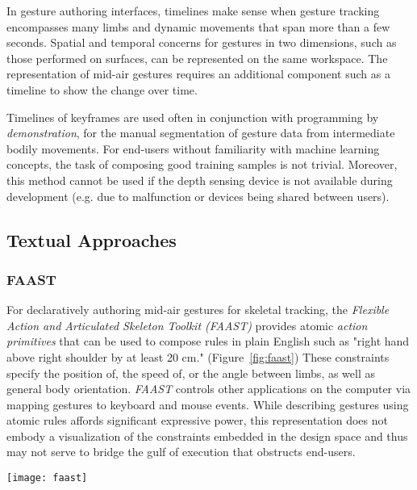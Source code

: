 In gesture authoring interfaces, timelines make sense when gesture tracking encompasses many limbs and dynamic movements that span more than a few seconds. Spatial and temporal concerns for gestures in two dimensions, such as those performed on surfaces, can be represented on the same workspace. The representation of mid-air gestures requires an additional component such as a timeline to show the change over time.

Timelines of keyframes are used often in conjunction with programming by \emph{demonstration}, for the manual segmentation of gesture data from intermediate bodily movements. For end-users without familiarity with machine learning concepts, the task of composing good training samples is not trivial. Moreover, this method cannot be used if the depth sensing device is not available during development (e.g. due to malfunction or devices being shared between users).

\subsection{Textual Approaches}

\subsubsection{FAAST}

For declaratively authoring mid-air gestures for skeletal tracking, the \emph{Flexible Action and Articulated Skeleton Toolkit (FAAST)} \parencite{Suma:2013} provides atomic \emph{action primitives} that can be used to compose rules in plain English such as "right hand above right shoulder by at least 20 cm." (Figure~\ref{fig:faast}) These constraints specify the position of, the speed of, or the angle between limbs, as well as general body orientation. \emph{FAAST} controls other applications on the computer via mapping gestures to keyboard and mouse events. While describing gestures using atomic rules affords significant expressive power, this representation does not embody a visualization of the constraints embedded in the design space and thus may not serve to bridge the gulf of execution that obstructs end-users.

\begin{SCfigure}[\sidecaptionrelwidth][ht]
\centering
\texttt{[image: faast]}
\caption{FAAST \parencite{Suma:2013} provides atomic primitives that can be used to compose rules in plain English that map to mid-air gestures.}
\label{fig:faast}
\end{SCfigure}

